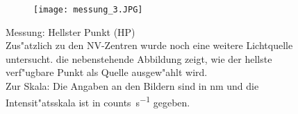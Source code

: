 \begin{figure}[htbp]
        \begin{subfigure}[b][][t]{0.43\textwidth}
            \texttt{[image: messung\_3.JPG]}
        \end{subfigure}
        \hfill
        \begin{minipage}[b][][t]{0.5\textwidth}
            \caption{
                Messung: Hellster Punkt (HP)
                \\
                Zus"atzlich zu den NV-Zentren wurde noch eine weitere Lichtquelle untersucht.
                die nebenstehende Abbildung zeigt, wie der hellste verf"ugbare Punkt als Quelle ausgew"ahlt wird.
                \\
                Zur Skala: Die Angaben an den Bildern sind in \si{\nano\metre} und die Intensit"atsskala ist in \si{counts\per\second} gegeben.
                }
            \label{fig:hell}
        \end{minipage}
\end{figure}

